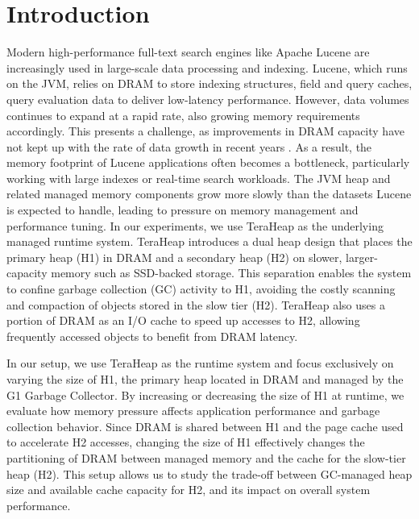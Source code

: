 \section{Introduction}


Modern high-performance full-text search engines like Apache Lucene
\cite{lucene_dimitris} are increasingly used in large-scale data processing and
indexing. Lucene, which runs on the JVM, relies on DRAM to store indexing
structures, field and query caches, query evaluation data to deliver low-latency
performance. However, data volumes continues to expand at a rapid rate, also
growing memory requirements accordingly. This presents a challenge, as
improvements in DRAM capacity have not kept up with the rate of data growth in
recent years \cite{DAOS, Borg}. As a result, the memory footprint of Lucene
applications often becomes a bottleneck, particularly working with large indexes
or real-time search workloads. The JVM heap and related managed memory
components grow more slowly than the datasets Lucene is expected to handle,
leading to pressure on memory management and performance tuning. In our
experiments, we use TeraHeap as the underlying managed runtime system. TeraHeap
introduces a dual heap design that places the primary heap (H1) in DRAM and a
secondary heap (H2) on slower, larger-capacity memory such as SSD-backed
storage. This separation enables the system to confine garbage collection (GC)
activity to H1, avoiding the costly scanning and compaction of objects stored in
the slow tier (H2). TeraHeap also uses a portion of DRAM as an I/O cache to
speed up accesses to H2, allowing frequently accessed objects to benefit from
DRAM latency.

In our setup, we use TeraHeap \cite{TeraHeap} as the runtime system and focus
exclusively on varying the size of H1, the primary heap located in DRAM and
managed by the G1 Garbage Collector. By increasing or decreasing the size of H1
at runtime, we evaluate how memory pressure affects application performance and
garbage collection behavior. Since DRAM is shared between H1 and the page cache
used to accelerate H2 accesses, changing the size of H1 effectively changes the
partitioning of DRAM between managed memory and the cache for the slow-tier heap
(H2). This setup allows us to study the trade-off between GC-managed heap size
and available cache capacity for H2, and its impact on overall system
performance.

